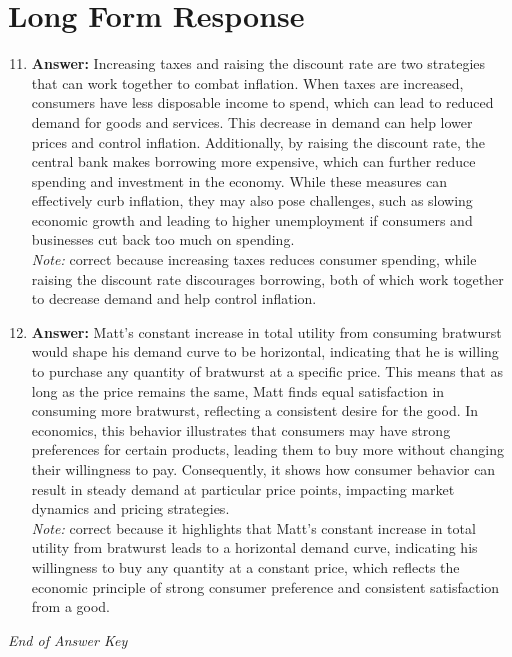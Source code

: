 \documentclass[12pt]{article}
\begin{document}
\section*{Long Form Response}
\begin{enumerate}[label=\arabic*.]
\setcounter{enumi}{10}
\item \textbf{Answer:} Increasing taxes and raising the discount rate are two strategies that can work together to combat inflation. When taxes are increased, consumers have less disposable income to spend, which can lead to reduced demand for goods and services. This decrease in demand can help lower prices and control inflation. Additionally, by raising the discount rate, the central bank makes borrowing more expensive, which can further reduce spending and investment in the economy. While these measures can effectively curb inflation, they may also pose challenges, such as slowing economic growth and leading to higher unemployment if consumers and businesses cut back too much on spending.
\\ \textit{Note:} correct because increasing taxes reduces consumer spending, while raising the discount rate discourages borrowing, both of which work together to decrease demand and help control inflation.
\item \textbf{Answer:} Matt's constant increase in total utility from consuming bratwurst would shape his demand curve to be horizontal, indicating that he is willing to purchase any quantity of bratwurst at a specific price. This means that as long as the price remains the same, Matt finds equal satisfaction in consuming more bratwurst, reflecting a consistent desire for the good. In economics, this behavior illustrates that consumers may have strong preferences for certain products, leading them to buy more without changing their willingness to pay. Consequently, it shows how consumer behavior can result in steady demand at particular price points, impacting market dynamics and pricing strategies.
\\ \textit{Note:} correct because it highlights that Matt's constant increase in total utility from bratwurst leads to a horizontal demand curve, indicating his willingness to buy any quantity at a constant price, which reflects the economic principle of strong consumer preference and consistent satisfaction from a good.
\end{enumerate}

\vfill
\noindent\textit{End of Answer Key}
\end{document}
